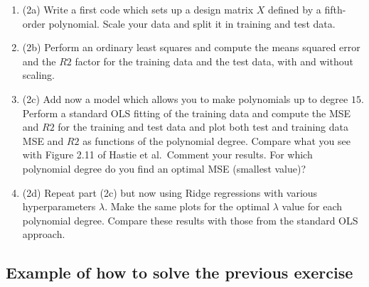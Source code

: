 \documentclass[%
oneside,                 %
final,                   %
10pt]{article}
\begin{document}
\begin{enumerate}
\item (2a) Write a first code which sets up a design matrix $X$ defined by a fifth-order polynomial.  Scale your data and split it in training and test data. 

\item (2b) Perform an ordinary least squares and compute the means squared error and the $R2$ factor for the training data and the test data, with and without scaling.

\item (2c) Add now a model which allows you to make polynomials up to degree $15$.  Perform a standard OLS fitting of the training data and compute the MSE and $R2$ for the training and test data and plot both test and training data MSE and $R2$ as functions of the polynomial degree. Compare what you see with Figure 2.11 of Hastie et al.~Comment your results. For which polynomial degree do you find an optimal MSE (smallest value)?

\item (2d) Repeat part (2c) but now using Ridge regressions with various hyperparameters $\lambda$. Make the same plots for the optimal $\lambda$ value for each polynomial degree. Compare these results with those from the standard OLS approach.
\end{enumerate}

\noindent
\subsection*{Example of how to solve the previous exercise}
\end{document}
